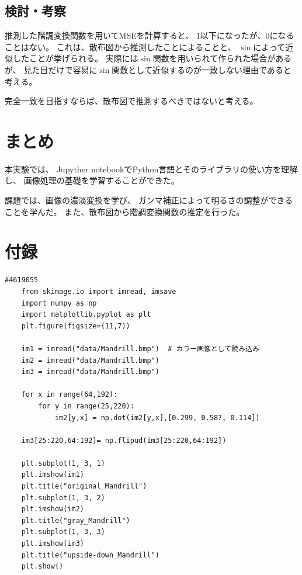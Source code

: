 \documentclass[12pt]{jarticle}
\begin{document}
\subsection{検討・考察}

推測した階調変換関数を用いてMSEを計算すると、
1以下になったが、0になることはない。
これは、散布図から推測したことによることと、
$\sin$によって近似したことが挙げられる。
実際には$\sin$関数を用いられて作られた場合があるが、
見た目だけで容易に$\sin$関数として近似するのが一致しない理由であると考える。

完全一致を目指すならば、散布図で推測するべきではないと考える。

\section{まとめ}
本実験では、
Jupyther notebookでPython言語とそのライブラリの使い方を理解し、
画像処理の基礎を学習することができた。

課題では、画像の濃淡変換を学び、
ガンマ補正によって明るさの調整ができることを学んだ。
また、散布図から階調変換関数の推定を行った。

\clearpage
\appendix
\section{付録}

\begin{lstlisting}[style = py,caption=kadai1]
    #4619055
    from skimage.io import imread, imsave
    import numpy as np
    import matplotlib.pyplot as plt
    plt.figure(figsize=(11,7))
    
    im1 = imread("data/Mandrill.bmp")  # カラー画像として読み込み
    im2 = imread("data/Mandrill.bmp")
    im3 = imread("data/Mandrill.bmp")
    
    for x in range(64,192):
        for y in range(25,220):
            im2[y,x] = np.dot(im2[y,x],[0.299, 0.587, 0.114])
    
    im3[25:220,64:192]= np.flipud(im3[25:220,64:192])
    
    plt.subplot(1, 3, 1)
    plt.imshow(im1)
    plt.title("original_Mandrill") 
    plt.subplot(1, 3, 2)
    plt.imshow(im2)
    plt.title("gray_Mandrill") 
    plt.subplot(1, 3, 3)
    plt.imshow(im3)
    plt.title("upside-down_Mandrill")
    plt.show()
\end{lstlisting}
\end{document}
